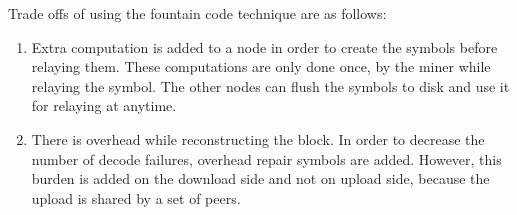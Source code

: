 Trade offs of using the fountain code technique are as follows:

\begin{enumerate}
    \item Extra computation is added to a node in order to create the symbols
        before relaying them. These computations are only done once, by the miner while relaying the symbol. The other nodes can flush the symbols to disk and use it for relaying at anytime. 
    \item There is overhead while reconstructing the block. In order to
        decrease the number of decode failures, overhead repair symbols are
        added. However, this burden is added on the download side and not on
        upload side, because the upload is shared by a set of peers.
\end{enumerate}
